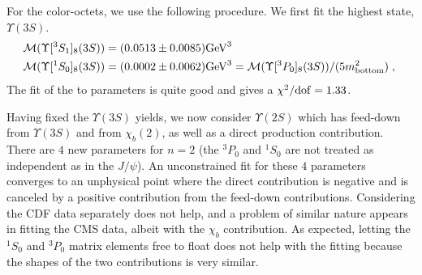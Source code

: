 \documentclass[article,showpacs,preprintnumbers,amsmath,amssymb]{revtex4}
\newcommand{\rGeV}{{\rm GeV}}
\newcommand{\rdof}{{\rm dof}}
\newcommand{\bottom}{{\rm{bottom}}}
\begin{document}
\begin{appendix}
For the color-octets, we use the following procedure. We first fit the highest
state, $\Upsilon(3S)$. 
\begin{equation}
\begin{split}
{\cal{M}}(\Upsilon[^3S_1]_{8}(3S)) &= (0.0513\pm 0.0085) \rGeV^3\\
{\cal{M}}(\Upsilon[^1S_0]_{8}(3S)) &= (0.0002\pm 0.0062) \rGeV^3=
{\cal{M}}(\Upsilon[^3P_0]_{8}(3S))/(5m_{\bottom}^2)\;,
~\label{eq:MUn3CO_val}
\end{split}
\end{equation}
The fit of the to parameters is quite good and gives a $\chi^2/\rdof=1.33$. 

Having fixed the $\Upsilon(3S)$ yields, we now consider $\Upsilon(2S)$ which has
feed-down from $\Upsilon(3S)$ and from $\chi_b(2)$, as well as a direct
production contribution. There are $4$ new parameters for $n=2$ (the $^3P_0$
and $^1S_0$ are not treated as independent as in the $J/\psi$). An unconstrained fit for these $4$
parameters converges to an unphysical point where the direct contribution is negative and
is canceled by a positive contribution from the feed-down contributions.
Considering the CDF data separately does not help, and a problem of similar
nature appears in fitting the CMS data, albeit with the $\chi_b$ contribution.
As expected, letting the $^1S_0$ and $^3P_0$ matrix elements free to float does
not help with the fitting because the shapes of the two contributions is very
similar.


\end{appendix}
\end{document}
